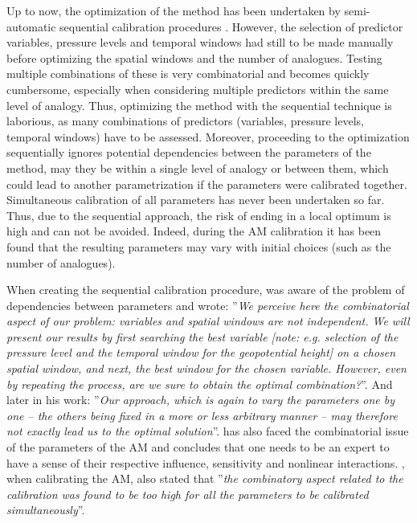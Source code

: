 \documentclass{ametsoc}
\begin{document}
Up to now, the optimization of the method has been undertaken by semi-automatic sequential calibration procedures \citep[see][for its definition]{Bontron2004, Horton2016}. However, the selection of predictor variables, pressure levels and temporal windows had still to be made manually before optimizing the spatial windows and the number of analogues. Testing multiple combinations of these is very combinatorial and becomes quickly cumbersome, especially when considering multiple predictors within the same level of analogy. Thus, optimizing the method with the sequential technique is laborious, as many combinations of predictors (variables, pressure levels, temporal windows) have to be assessed. Moreover, proceeding to the optimization sequentially ignores potential dependencies between the parameters of the method, may they be within a single level of analogy or between them, which could lead to another parametrization if the parameters were calibrated together. Simultaneous calibration of all parameters has never been undertaken so far. Thus, due to the sequential approach, the risk of ending in a local optimum is high and can not be avoided. Indeed, during the AM calibration it has been found that the resulting parameters may vary with initial choices (such as the number of analogues).

When creating the sequential calibration procedure, \citet{Bontron2004} was aware of the problem of dependencies between parameters and wrote: ''\textit{We perceive here the combinatorial aspect of our problem: variables and spatial windows are not independent. We will present our results by first searching the best variable [note: e.g. selection of the pressure level and the temporal window for the geopotential height] on a chosen spatial window, and next, the best window for the chosen variable. However, even by repeating the process, are we sure to obtain the optimal combination?}''. And later in his work: ''\textit{Our approach, which is again to vary the parameters one by one -- the others being fixed in a more or less arbitrary manner -- may therefore not exactly lead us to the optimal solution}''. \citet{Bliefernicht2010} has also faced the combinatorial issue of the parameters of the AM and concludes that one needs to be an expert to have a sense of their respective influence, sensitivity and nonlinear interactions. \citet{BenDaoud2010}, when calibrating the AM, also stated that ''\textit{the combinatory aspect related to the calibration was found to be too high for all the parameters to be calibrated simultaneously}''.
\end{document}
